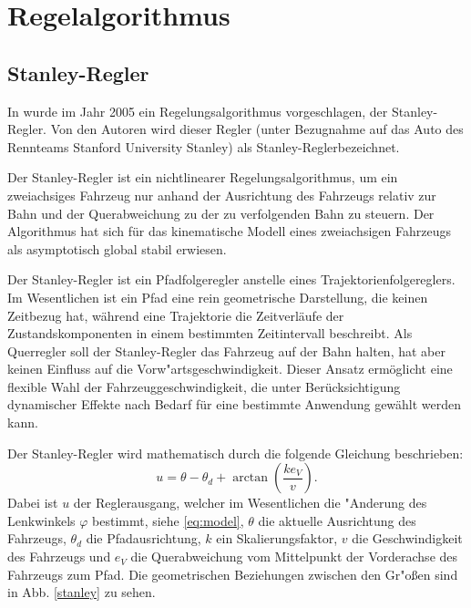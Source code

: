 \documentclass[arbeit=studie,oneside,BCOR=12mm]{ArbeitRST}
\begin{document}
\chapter{Regelalgorithmus}

\section{Stanley-Regler}

In \cite{stanley} wurde im Jahr 2005 ein Regelungsalgorithmus vorgeschlagen,
der Stanley-Regler. Von den Autoren wird dieser Regler (unter Bezugnahme auf
das Auto des Rennteams Stanford University \glqq Stanley\grqq) als
\glqq Stanley-Regler\grqq bezeichnet.

Der Stanley-Regler ist ein nichtlinearer Regelungsalgorithmus, um ein
zweiachsiges Fahrzeug nur anhand der Ausrichtung des Fahrzeugs relativ zur Bahn
und der Querabweichung zu der zu verfolgenden Bahn zu steuern. Der Algorithmus hat
sich für das kinematische Modell eines zweiachsigen Fahrzeugs als asymptotisch
global stabil erwiesen. \cite{stanley}

Der Stanley-Regler ist ein Pfadfolgeregler anstelle eines
Trajektorienfolgereglers. Im Wesentlichen ist ein Pfad eine rein geometrische
Darstellung, die keinen Zeitbezug hat, während eine Trajektorie die
Zeitverläufe der Zustandskomponenten in einem bestimmten Zeitintervall
beschreibt. Als Querregler soll der Stanley-Regler das Fahrzeug auf der Bahn halten, hat aber
keinen Einfluss auf die Vorw"artsgeschwindigkeit. Dieser Ansatz ermöglicht eine
flexible Wahl der Fahrzeuggeschwindigkeit, die unter Berücksichtigung
dynamischer Effekte nach Bedarf für eine bestimmte Anwendung gewählt werden
kann. \cite{stanley}

Der Stanley-Regler wird mathematisch durch die folgende Gleichung beschrieben:
\begin{equation} 
  u = \theta - \theta_d + \arctan\left(\frac{ke_{V}}{v}\right).
  \label{eq:Stanley-Regler} 
\end{equation}
Dabei ist $u$ der Reglerausgang, welcher im Wesentlichen die "Anderung des Lenkwinkels $\varphi$
bestimmt, siehe \eqref{eq:model}, $\theta$ die aktuelle Ausrichtung des Fahrzeugs,
$\theta_d$ die Pfadausrichtung, $k$ ein Skalierungsfaktor, $v$ die
Geschwindigkeit des Fahrzeugs und $e_{V}$ die Querabweichung vom Mittelpunkt
der Vorderachse des Fahrzeugs zum Pfad. Die geometrischen Beziehungen zwischen
den Gr"o{\ss}en sind in Abb. \ref{stanley} zu sehen.
\end{document}
